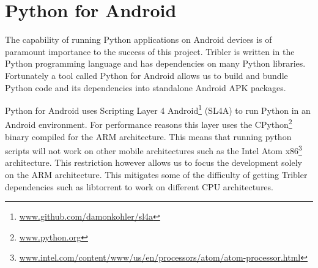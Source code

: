 \section{Python for Android}
	\label{sec:p4a}
	The capability of running Python applications on Android devices is of paramount importance to the success of this project. Tribler is written in the Python programming language and has dependencies on many Python libraries. Fortunately a tool called Python for Android allows us to build and bundle Python code and its dependencies into standalone Android APK packages.

	Python for Android uses Scripting Layer 4 Android\footnote{\href{https://github.com/damonkohler/sl4a}{www.github.com/damonkohler/sl4a}} (SL4A) to run Python in an Android environment. For performance reasons this layer uses the CPython\footnote{\href{https://www.python.org/}{www.python.org}} binary compiled for the ARM architecture. This means that running python scripts will not work on other mobile architectures such as the Intel Atom x86\footnote{\href{http://www.intel.com/content/www/us/en/processors/atom/atom-processor.html}{www.intel.com/content/www/us/en/processors/atom/atom-processor.html}} architecture. This restriction however allows us to focus the development solely on the ARM architecture. This mitigates some of the difficulty of getting Tribler dependencies such as libtorrent to work on different CPU architectures.
